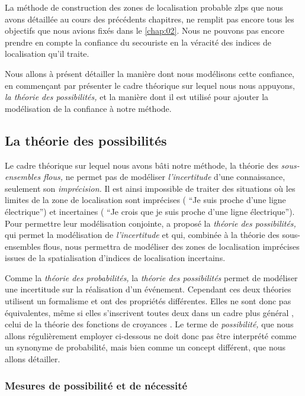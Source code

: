 La méthode de construction des zones de localisation probable
\acp{zlp} que nous avons détaillée au cours des précédents chapitres,
ne remplit pas encore tous les objectifs que nous avions fixés dans le
\autoref{chap:02}. Nous ne pouvons pas encore prendre en compte la
confiance du secouriste en la véracité des indices de localisation
qu'il traite.

Nous allons à présent détailler la manière dont nous modélisons cette
confiance, en commençant par présenter le cadre théorique sur lequel
nous nous appuyons, \emph{la théorie des possibilités,} et la manière
dont il est utilisé pour ajouter la modélisation de la confiance à
notre méthode.

\subsection{La théorie des possibilités}

Le cadre théorique sur lequel nous avons bâti notre méthode, la
théorie des \emph{sous-ensembles flous,} ne permet pas de modéliser
\emph{l'incertitude} d'une connaissance, seulement son
\emph{imprécision.} Il est ainsi impossible de traiter des situations
où les limites de la zone de localisation sont imprécises (\eg
\enquote{Je suis proche d'une ligne électrique}) et incertaines (\eg
\enquote{Je crois que je suis proche d'une ligne électrique}). Pour
permettre leur modélisation conjointe, \textcite{Zadeh1978} a proposé
la \emph{théorie des possibilités,} qui permet la modélisation de
\emph{l'incertitude} et qui, combinée à la théorie des sous-ensembles
flous, nous permettra de modéliser des zones de localisation
imprécises issues de la spatialisation d'indices de localisation
incertains.

Comme la \emph{théorie des probabilités,} la \emph{théorie des
  possibilités} permet de modéliser une incertitude sur la réalisation
d'un événement. Cependant ces deux théories utilisent un formalisme et
ont des propriétés différentes. Elles ne sont donc pas équivalentes,
même si elles s’inscrivent toutes deux dans un cadre plus général
\autocite{Bouchon-Meunier1995}, celui de la théorie des fonctions de
croyances \autocite{Shafer1976}. Le terme de \emph{possibilité,} que
nous allons régulièrement employer ci-dessous ne doit donc pas être
interprété comme un synonyme de probabilité, mais bien comme un
concept différent, que nous allons détailler.

\subsubsection{Mesures de possibilité et de nécessité}

